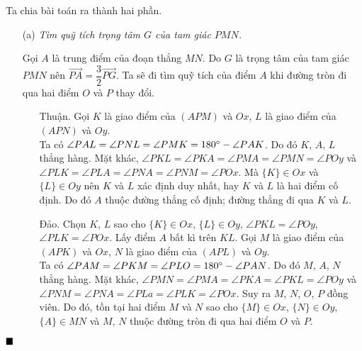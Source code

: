 \documentclass{article} %
\newenvironment{solution}[1][Lời giải]{%
  \proof[\faPenNib \hspace{0.2cm} \ttfamily \scshape \large #1]%
}{\(\hfill \blacksquare\){\parfillskip0pt\par}}
\begin{document}
        \begin{solution}
            Ta chia bài toán ra thành hai phần.
            
            \begin{enumerate}
            
                \item[(a)] \textit{Tìm quỹ tích trọng tâm \(G\) của tam giác \(PMN\).}

                Gọi \(A\) là trung điểm của đoạn thẳng \(MN\). Do \(G\) là trọng tâm của tam giác \(PMN\) nên \(\overrightarrow{PA} = \dfrac{3}{2}\overrightarrow{PG}\). Ta sẽ đi tìm quỹ tích của điểm \(A\) khi đường tròn đi qua hai điểm \(O\) và \(P\) thay đổi.

                \begin{enumerate}[leftmargin=1.25cm]
                
                    \item[Thuận.] Gọi \(K\) là giao điểm của \((APM)\) và \(Ox\), \(L\) là giao điểm của \((APN)\) và \(Oy\).\\
                    Ta có \(\angle PAL = \angle PNL = \angle PMK = 180 \degree - \angle PAK\). Do đó \(K\), \(A\), \(L\) thẳng hàng. Mặt khác, \(\angle PKL = \angle PKA = \angle PMA = \angle PMN = \angle POy\) và \(\angle PLK = \angle PLA = \angle PNA = \angle PNM = \angle POx\). Mà \(\{K\} \in Ox\) và \(\{L\} \in Oy\) nên \(K\) và \(L\) xác định duy nhất, hay \(K\) và \(L\) là hai điểm cố định. Do đó \(A\) thuộc đường thẳng cố định; đường thẳng đi qua \(K\) và \(L\).

                    \item[Đảo.] Chọn \(K\), \(L\) sao cho \(\{K\} \in Ox\), \(\{L\} \in Oy\), \(\angle PKL = \angle POy\), \(\angle PLK = \angle POx\). Lấy điểm \(A\) bất kì trên \(KL\). Gọi \(M\) là giao điểm của \((APK)\) và \(Ox\), \(N\) là giao điểm của \((APL)\) và \(Oy\).\\
                    Ta có \(\angle PAM = \angle PKM = \angle PLO = 180 \degree - \angle PAN\). Do đó \(M\), \(A\), \(N\) thẳng hàng. Mặt khác, \(\angle PMN = \angle PMA = \angle PKA = \angle PKL = \angle POy\) và \(\angle PNM = \angle PNA = \angle PLa = \angle PLK = \angle POx\). Suy ra \(M\), \(N\), \(O\), \(P\) đồng viên. Do đó, tồn tại hai điểm \(M\) và \(N\) sao cho \(\{M\} \in Ox\), \(\{N\} \in Oy\), \(\{A\} \in MN\) và \(M\), \(N\) thuộc đường tròn đi qua hai điểm \(O\) và \(P\).
                
                \end{enumerate}


\end{enumerate}
\end{solution}
\end{document}
